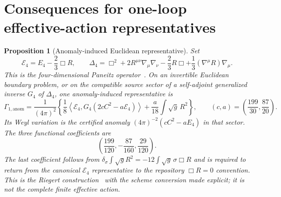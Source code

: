 \documentclass[11pt]{article}
\newtheorem{proposition}[theorem]{Proposition}
\theoremstyle{definition}
\theoremstyle{remark}
\begin{document}
\section{Consequences for one-loop effective-action representatives}

\begin{proposition}[Anomaly-induced Euclidean representative]
Set
\[
 \mathcal E_4=E_4-\frac23\Box R,
 \qquad
 \Delta_4=\Box^2+2R^{\mu\nu}\nabla_\mu\nabla_\nu
 -\frac23R\Box+\frac13(\nabla^\mu R)\nabla_\mu .
\]
This is the four-dimensional Paneitz operator~\cite{Paneitz}.
On an invertible Euclidean boundary problem, or on the compatible source
sector of a self-adjoint generalized inverse $G_4$ of $\Delta_4$, one
anomaly-induced representative is
\[
 \Gamma_{1,\mathrm{anom}}
 =\frac1{(4\pi)^2}\left\{
 \frac18\left\langle\mathcal E_4,
 G_4\left(2cC^2-a\mathcal E_4\right)\right\rangle
 +\frac{a}{18}\int\sqrt g\,R^2
 \right\},
 \qquad
 (c,a)=\left(\frac{199}{30},\frac{87}{20}\right).
\]
Its Weyl variation is the certified anomaly
$(4\pi)^{-2}(cC^2-aE_4)$ in that sector.  The three functional coefficients
are
\[
 \left(\frac{199}{120},-\frac{87}{160},\frac{29}{120}\right).
\]
The last coefficient follows from
$\delta_\sigma\int\sqrt g R^2=-12\int\sqrt g\,\sigma\Box R$ and is required
to return from the canonical $\mathcal E_4$ representative to the repository
$\Box R=0$ convention.  This is the Riegert construction~\cite{Riegert}
with the scheme conversion made explicit; it is not the complete finite
effective action.
\end{proposition}
\end{document}
